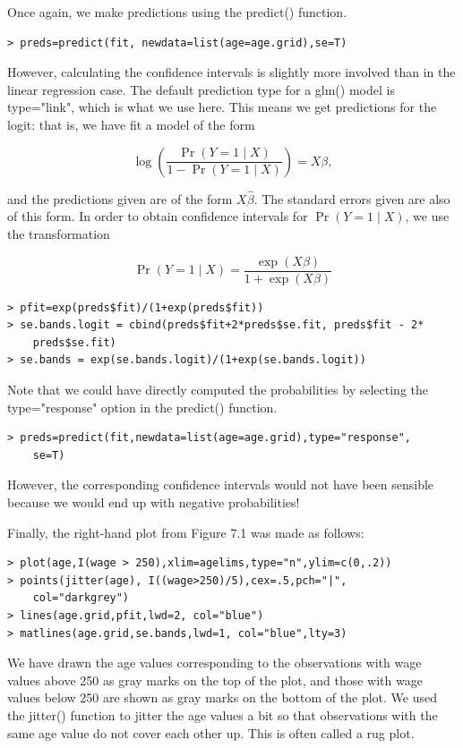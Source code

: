 \documentclass[10pt]{article}
\begin{document}
Once again, we make predictions using the predict() function.

\begin{verbatim}
> preds=predict(fit, newdata=list(age=age.grid),se=T)
\end{verbatim}

However, calculating the confidence intervals is slightly more involved than in the linear regression case. The default prediction type for a glm() model is type="link", which is what we use here. This means we get predictions for the logit: that is, we have fit a model of the form

$$
\log \left(\frac{\operatorname{Pr}(Y=1 \mid X)}{1-\operatorname{Pr}(Y=1 \mid X)}\right)=X \beta,
$$

and the predictions given are of the form $X \hat{\beta}$. The standard errors given are also of this form. In order to obtain confidence intervals for $\operatorname{Pr}(Y=1 \mid X)$, we use the transformation

$$
\operatorname{Pr}(Y=1 \mid X)=\frac{\exp (X \beta)}{1+\exp (X \beta)}
$$

\begin{verbatim}
> pfit=exp(preds$fit)/(1+exp(preds$fit))
> se.bands.logit = cbind(preds$fit+2*preds$se.fit, preds$fit - 2*
    preds$se.fit)
> se.bands = exp(se.bands.logit)/(1+exp(se.bands.logit))
\end{verbatim}

Note that we could have directly computed the probabilities by selecting the type="response" option in the predict() function.

\begin{verbatim}
> preds=predict(fit,newdata=list(age=age.grid),type="response",
    se=T)
\end{verbatim}

However, the corresponding confidence intervals would not have been sensible because we would end up with negative probabilities!

Finally, the right-hand plot from Figure 7.1 was made as follows:

\begin{verbatim}
> plot(age,I(wage > 250),xlim=agelims,type="n",ylim=c(0,.2))
> points(jitter(age), I((wage>250)/5),cex=.5,pch="|",
    col="darkgrey")
> lines(age.grid,pfit,lwd=2, col="blue")
> matlines(age.grid,se.bands,lwd=1, col="blue",lty=3)
\end{verbatim}

We have drawn the age values corresponding to the observations with wage values above 250 as gray marks on the top of the plot, and those with wage values below 250 are shown as gray marks on the bottom of the plot. We used the jitter() function to jitter the age values a bit so that observations with the same age value do not cover each other up. This is often called a rug plot.
\end{document}
